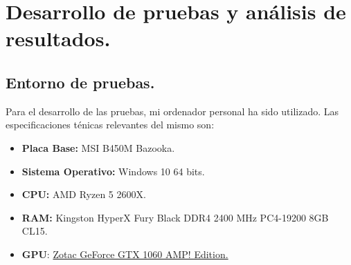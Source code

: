 \chapter{Desarrollo de pruebas y análisis de resultados.}
\section{Entorno de pruebas.}
Para el desarrollo de las pruebas, mi ordenador personal ha sido utilizado. Las especificaciones ténicas relevantes del mismo son:

\begin{itemize}
\item \textbf{Placa Base:} MSI B450M Bazooka.
\item \textbf{Sistema Operativo:} Windows 10 64 bits.
\item \textbf{CPU:} AMD Ryzen 5 2600X.
\item \textbf{RAM:} Kingston HyperX Fury Black DDR4 2400 MHz PC4-19200 8GB CL15.
\item \textbf{GPU}: \underline{Zotac GeForce GTX 1060 AMP! Edition.}
\end{itemize}

